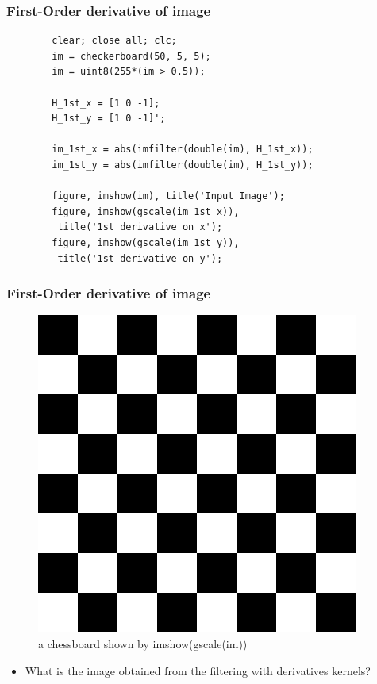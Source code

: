 \documentclass[english,11pt,table,handout]{beamer}
\begin{document}
\begin{frame}[fragile]

	\frametitle{First-Order derivative of image}
	\begin{example}
		\lstset{language=Matlab}
		\begin{lstlisting}
		clear; close all; clc;
		im = checkerboard(50, 5, 5);
		im = uint8(255*(im > 0.5));
		
		H_1st_x = [1 0 -1];
		H_1st_y = [1 0 -1]';
	
		im_1st_x = abs(imfilter(double(im), H_1st_x));
		im_1st_y = abs(imfilter(double(im), H_1st_y));
		
		figure, imshow(im), title('Input Image');
		figure, imshow(gscale(im_1st_x)),
		 title('1st derivative on x');
		figure, imshow(gscale(im_1st_y)),
		 title('1st derivative on y');
		\end{lstlisting}
	\end{example}
	
\end{frame}
\begin{frame}[fragile]
	
	\frametitle{First-Order derivative of image}
	\begin{exercise}
		\begin{figure}[!h]
			\includegraphics[scale=0.35]{checkboard.png}
			\caption{a chessboard shown by \alert{imshow(gscale(im))}}
		\end{figure}
		
		\begin{itemize}
			\item What is the image obtained from the filtering with derivatives kernels?
		\end{itemize}
	\end{exercise}
	
\end{frame}
\end{document}
